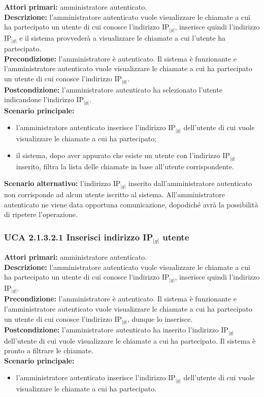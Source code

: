 \noindent
\textbf{Attori primari:} amministratore autenticato.\\
\textbf{Descrizione:} l'amministratore autenticato vuole visualizzare le chiamate a cui ha partecipato un utente di cui conosce l'indirizzo IP$_{|g|}$, inserisce quindi l'indirizzo IP$_{|g|}$ e il sistema provvederà a visualizzare le chiamate a cui l'utente ha partecipato.\\
\textbf{Precondizione:} l'amministratore è autenticato. Il sistema è funzionante e l'amministratore autenticato vuole visualizzare le chiamate a cui ha partecipato un utente di cui conosce l'indirizzo IP$_{|g|}$.\\
\textbf{Postcondizione:} l'amministratore autenticato ha selezionato l'utente indicandone l'indirizzo IP$_{|g|}$.\\
\textbf{Scenario principale:}
\begin{itemize}
\item l'amministratore autenticato inserisce l'indirizzo IP$_{|g|}$ dell'utente di cui vuole visualizzare le chiamate a cui ha partecipato;
\item il sistema, dopo aver appurato che esiste un utente con l'indirizzo IP$_{|g|}$ inserito, filtra la lista delle chiamate in base all'utente corrispondente.
\end{itemize}
\textbf{Scenario alternativo:} l'indirizzo IP$_{|g|}$ inserito dall'amministratore autenticato non corrisponde ad alcun utente iscritto al sistema. All'amministratore autenticato ne viene data opportuna comunicazione, dopodiché avrà la possibilità di ripetere l'operazione.

\subsubsection{UCA 2.1.3.2.1 Inserisci indirizzo IP$_{|g|}$ utente}
\noindent
\textbf{Attori primari:} amministratore autenticato.\\
\textbf{Descrizione:} l'amministratore autenticato vuole visualizzare le chiamate a cui ha partecipato un utente di cui conosce l'indirizzo IP$_{|g|}$, inserisce quindi l'indirizzo IP$_{|g|}$.\\
\textbf{Precondizione:} l'amministratore è autenticato. Il sistema è funzionante e l'amministratore autenticato vuole visualizzare le chiamate a cui ha partecipato un utente di cui conosce l'indirizzo IP$_{|g|}$, dunque lo inserisce.\\
\textbf{Postcondizione:} l'amministratore autenticato ha inserito l'indirizzo IP$_{|g|}$ dell'utente di cui vuole visualizzare le chiamate a cui ha partecipato. Il sistema è pronto a filtrare le chiamate.\\
\textbf{Scenario principale:}
\begin{itemize}
\item l'amministratore autenticato inserisce l'indirizzo IP$_{|g|}$ dell'utente di cui vuole visualizzare le chiamate a cui ha partecipato.
\end{itemize}

